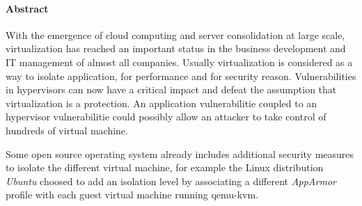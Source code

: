 \paragraph{Abstract}
With the emergence of cloud computing and server consolidation at large scale,
virtualization has reached an important status in the business development and IT management
of almost all companies.
Usually virtualization is considered as a way to isolate application, for
performance and for security reason.
Vulnerabilities in hypervisors can now have a critical impact and defeat
the assumption that virtualization is a protection.
An application vulnerabilitie coupled to an hypervisor vulnerabilitie could
possibly allow an attacker to take control of hundreds of virtual machine.

Some open source operating system already includes additional security measures
to isolate the different virtual machine, for example the Linux distribution
\emph{Ubuntu}\cite{ubuntu} choosed to add an isolation level by associating a different
\emph{AppArmor}\cite{apparmor} profile with each guest virtual machine running
qemu-kvm.
